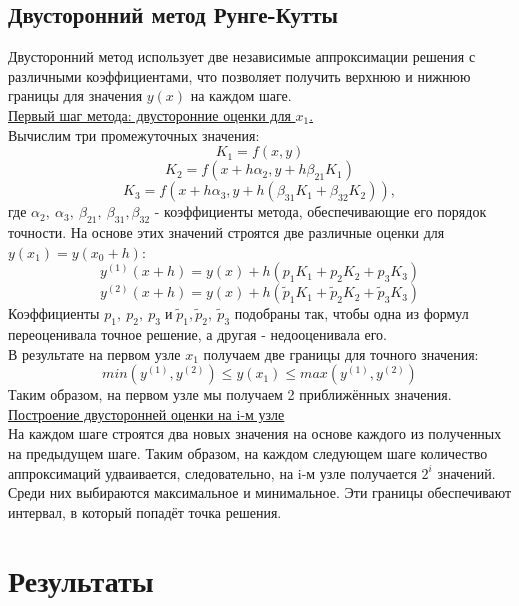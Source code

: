 \subsection{Двусторонний метод Рунге-Кутты}
Двусторонний метод использует две независимые аппроксимации решения с различными коэффициентами, что позволяет получить верхнюю и нижнюю границы для значения $y(x)$ на каждом шаге.\\
\underline{Первый шаг метода: двусторонние оценки для $x_1$.}\\
Вычислим три промежуточных значения:
$$K_1 = f(x, y)$$
$$K_2 = f(x + h \alpha_2, y + h \beta_{21}K_1)$$
$$K_3 = f(x + h \alpha_3, y + h(\beta_{31}K_1 + \beta_{32} K_2)),$$
где $\alpha_2, \: \alpha_3, \: \beta_{21}, \: \beta_{31}, \beta_{32}$ - коэффициенты метода, обеспечивающие его порядок точности.
На основе этих значений строятся две различные оценки для $y(x_1) = y(x_0 + h)$:
\[
y^{(1)}(x + h) = y(x) + h (p_1 K_1 + p_2 K_2 + p_3 K_3)
\]
\[
y^{(2)}(x + h) = y(x) + h (\tilde{p}_1 K_1 + \tilde{p}_2 K_2 + \tilde{p}_3 K_3)
\]
Коэффициенты $p_1, \: p_2, \: p_3 \; \text{и} \; \tilde{p}_1, \tilde{p}_2, \: \tilde{p}_3 $ подобраны так, чтобы одна из формул переоценивала точное решение, а другая - недооценивала его.\\
В результате на первом узле $x_1$ получаем две границы для точного значения:
$$min(y^{(1)}, y^{(2)}) \leqslant y(x_1) \leqslant max(y^{(1)}, y^{(2)})$$
Таким образом, на первом узле мы получаем 2 приближённых значения.\\
\underline{Построение двусторонней оценки на i-м узле}\\
На каждом шаге строятся два новых значения на основе каждого из полученных на предыдущем шаге. Таким образом, на каждом следующем шаге количество аппроксимаций удваивается, следовательно, на i-м узле получается $2^i$ значений. Среди них выбираются максимальное и минимальное. Эти границы обеспечивают интервал, в который попадёт точка решения.

\section{Результаты}
